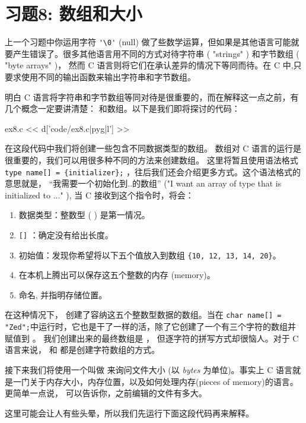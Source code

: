 \chapter{习题8: 数组和大小}

上一个习题中你运用字符 \verb|'\0'| (null) 做了些数学运算，但如果是其他语言可能就要产生错误了。很多其他语言用不同的方式对待字符串 ( "strings" ) 和字节数组 ( "byte arrays" )， 然而 C 语言则将它们在承认差异的情况下等同而待。在 C 中,只要求使用不同的输出函数来输出字符串和字节数组。

明白 C 语言将字符串和字节数组等同对待是很重要的，而在解释这一点之前，有几个概念一定要讲清楚：  和数组。以下是我们即将探讨的代码：

\begin{code}{ex8.c}
<< d['code/ex8.c|pyg|l'] >>
\end{code}

在这段代码中我们将创建一些包含不同数据类型的数组。 数组对 C 语言的运行是很重要的，我们可以用很多种不同的方法来创建数组。 这里将暂且使用语法格式 \verb|type name[] = {initializer};| ，往后我们还会介绍更多方式。这个语法格式的意思就是， “我需要一个初始化到{..}的数组” ("I want an array of
type that is initialized to {..}." ), 当 C 接收到这个指令时，将会： 

\begin{enumerate}
\item 数据类型：整数型 (  ) 是第一情况。
\item \verb|[]| ：确定没有给出长度。
\item 初始值：发现你希望将以下五个值放入到数组 \verb|{10, 12, 13, 14, 20}|。
\item 在本机上腾出可以保存这五个整数的内存 (memory)。
\item 命名,  并指明存储位置。
\end{enumerate}


在这种情况下，  创建了容纳这五个整数型数据的数组。当在 \verb|char name[] = "Zed";|中运行时，它也是干了一样的活，除了它创建了一个有三个字符的数组并赋值到 。 我们创建出来的最终数组是 ， 但逐字符的拼写方式却很恼人。对于 C 语言来说，  和  都是创建字符数组的方式。

接下来我们将使用一个叫做  来询问文件大小 (以 \emph{bytes} 为单位)。事实上 C 语言就是一门关于内存大小，内存位置，以及如何处理内存(pieces of memory)的语言。 更简单一点说， 可以告诉你，之前编辑的文件有多大。

这里可能会让人有些头晕，所以我们先运行下面这段代码再来解释。

